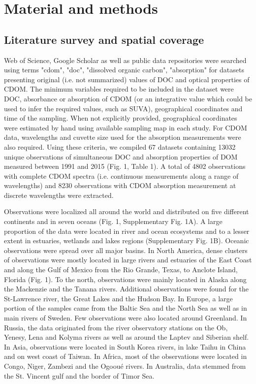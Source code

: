 
\section*{Material and methods}
\label{sec:Material and methods}

\subsection*{Literature survey and spatial coverage}

Web of Science, Google Scholar as well as public data repositories were searched using terms "cdom", "doc", "dissolved organic carbon", "absorption" for datasets presenting original (i.e. not summarized) values of DOC and optical properties of CDOM. The minimum variables required to be included in the dataset were DOC, absorbance or absorption of CDOM (or an integrative value which could be used to infer the required values, such as SUVA), geographical coordinates and time of the sampling. When not explicitly provided, geographical coordinates were estimated by hand using available sampling map in each study. For CDOM data, wavelengths and cuvette size used for the absorption measurements were also required. Using these criteria, we compiled 67 datasets containing 13032 unique observations of simultaneous DOC and absorption properties of DOM measured between 1991 and 2015 (Fig. 1, Table 1). A total of 4802 observations with complete CDOM spectra (i.e. continuous measurements along a range of wavelengths) and 8230 observations with CDOM absorption measurement at discrete wavelengths were extracted.

Observations were localized all around the world and distributed on five different continents and in seven oceans (Fig. 1, Supplementary Fig. 1A). A large proportion of the data were located in river and ocean ecosystems and to a lesser extent in estuaries, wetlands and lakes regions (Supplementary Fig. 1B). Oceanic observations were spread over all major basins. In North America, dense clusters of observations were mostly located in large rivers and estuaries of the East Coast and along the Gulf of Mexico from the Rio Grande, Texas, to Anclote Island, Florida (Fig. 1). To the north, observations were mainly located in Alaska along the Mackenzie and the Tanana rivers. Additional observations were found for the St-Lawrence river, the Great Lakes and the Hudson Bay. In Europe, a large portion of the samples came from the Baltic Sea and the North Sea as well as in main rivers of Sweden. Few observations were also located around Greenland. In Russia, the data originated from the river observatory stations on the Ob, Yenesy, Lena and Kolyma rivers as well as around the Laptev and Siberian shelf. In Asia, observations were located in South Korea rivers, in lake Taihu in China and on west coast of Taiwan. In Africa, most of the observations were located in Congo, Niger, Zambezi and the Ogooué rivers. In Australia, data stemmed from the St. Vincent gulf and the border of Timor Sea.

